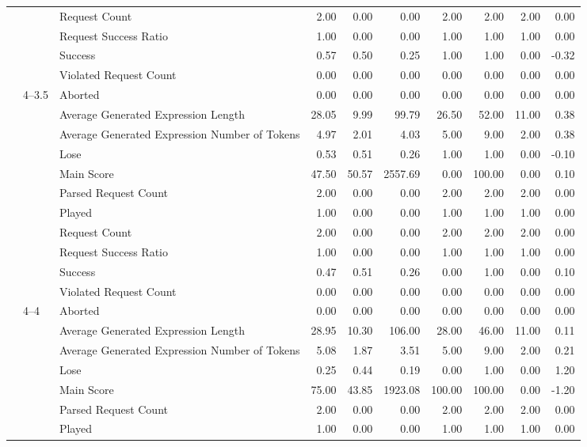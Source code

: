 \begin{tabular}{lllrrrrrrr}
 &  & Request Count & 2.00 & 0.00 & 0.00 & 2.00 & 2.00 & 2.00 & 0.00 \\
 &  & Request Success Ratio & 1.00 & 0.00 & 0.00 & 1.00 & 1.00 & 1.00 & 0.00 \\
 &  & Success & 0.57 & 0.50 & 0.25 & 1.00 & 1.00 & 0.00 & -0.32 \\
 &  & Violated Request Count & 0.00 & 0.00 & 0.00 & 0.00 & 0.00 & 0.00 & 0.00 \\
\cline{2-10}
 & \multirow[t]{11}{*}{4--3.5} & Aborted & 0.00 & 0.00 & 0.00 & 0.00 & 0.00 & 0.00 & 0.00 \\
 &  & Average Generated Expression Length & 28.05 & 9.99 & 99.79 & 26.50 & 52.00 & 11.00 & 0.38 \\
 &  & Average Generated Expression Number of Tokens & 4.97 & 2.01 & 4.03 & 5.00 & 9.00 & 2.00 & 0.38 \\
 &  & Lose & 0.53 & 0.51 & 0.26 & 1.00 & 1.00 & 0.00 & -0.10 \\
 &  & Main Score & 47.50 & 50.57 & 2557.69 & 0.00 & 100.00 & 0.00 & 0.10 \\
 &  & Parsed Request Count & 2.00 & 0.00 & 0.00 & 2.00 & 2.00 & 2.00 & 0.00 \\
 &  & Played & 1.00 & 0.00 & 0.00 & 1.00 & 1.00 & 1.00 & 0.00 \\
 &  & Request Count & 2.00 & 0.00 & 0.00 & 2.00 & 2.00 & 2.00 & 0.00 \\
 &  & Request Success Ratio & 1.00 & 0.00 & 0.00 & 1.00 & 1.00 & 1.00 & 0.00 \\
 &  & Success & 0.47 & 0.51 & 0.26 & 0.00 & 1.00 & 0.00 & 0.10 \\
 &  & Violated Request Count & 0.00 & 0.00 & 0.00 & 0.00 & 0.00 & 0.00 & 0.00 \\
\cline{2-10}
 & \multirow[t]{11}{*}{4--4} & Aborted & 0.00 & 0.00 & 0.00 & 0.00 & 0.00 & 0.00 & 0.00 \\
 &  & Average Generated Expression Length & 28.95 & 10.30 & 106.00 & 28.00 & 46.00 & 11.00 & 0.11 \\
 &  & Average Generated Expression Number of Tokens & 5.08 & 1.87 & 3.51 & 5.00 & 9.00 & 2.00 & 0.21 \\
 &  & Lose & 0.25 & 0.44 & 0.19 & 0.00 & 1.00 & 0.00 & 1.20 \\
 &  & Main Score & 75.00 & 43.85 & 1923.08 & 100.00 & 100.00 & 0.00 & -1.20 \\
 &  & Parsed Request Count & 2.00 & 0.00 & 0.00 & 2.00 & 2.00 & 2.00 & 0.00 \\
 &  & Played & 1.00 & 0.00 & 0.00 & 1.00 & 1.00 & 1.00 & 0.00 \\

\end{tabular}

